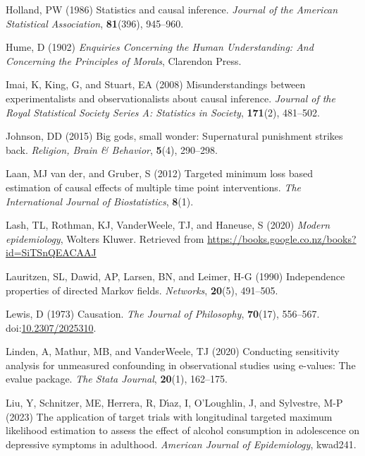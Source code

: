 \documentclass[
  single column]{article}
\newlength{\cslhangindent}
\newenvironment{CSLReferences}[2] %
 {\begin{list}{}{%
  \setlength{\itemindent}{0pt}
  \setlength{\leftmargin}{0pt}
  \setlength{\parsep}{0pt}
  \ifodd #1
   \setlength{\leftmargin}{\cslhangindent}
   \setlength{\itemindent}{-1\cslhangindent}
  \fi
  \setlength{\itemsep}{#2\baselineskip}}}
 {\end{list}}
\begin{document}
\begin{CSLReferences}{1}{0}
Holland, PW (1986) Statistics and causal inference. \emph{Journal of the
American Statistical Association}, \textbf{81}(396), 945--960.

Hume, D (1902) \emph{Enquiries Concerning the Human Understanding: And
Concerning the Principles of Morals}, Clarendon Press.

Imai, K, King, G, and Stuart, EA (2008) Misunderstandings between
experimentalists and observationalists about causal inference.
\emph{Journal of the Royal Statistical Society Series A: Statistics in
Society}, \textbf{171}(2), 481--502.

Johnson, DD (2015) Big gods, small wonder: Supernatural punishment
strikes back. \emph{Religion, Brain \& Behavior}, \textbf{5}(4),
290--298.

Laan, MJ van der, and Gruber, S (2012) Targeted minimum loss based
estimation of causal effects of multiple time point interventions.
\emph{The International Journal of Biostatistics}, \textbf{8}(1).

Lash, TL, Rothman, KJ, VanderWeele, TJ, and Haneuse, S (2020)
\emph{Modern epidemiology}, Wolters Kluwer. Retrieved from
\url{https://books.google.co.nz/books?id=SiTSnQEACAAJ}

Lauritzen, SL, Dawid, AP, Larsen, BN, and Leimer, H-G (1990)
Independence properties of directed {M}arkov fields. \emph{Networks},
\textbf{20}(5), 491--505.

Lewis, D (1973) Causation. \emph{The Journal of Philosophy},
\textbf{70}(17), 556--567.
doi:\href{https://doi.org/10.2307/2025310}{10.2307/2025310}.

Linden, A, Mathur, MB, and VanderWeele, TJ (2020) Conducting sensitivity
analysis for unmeasured confounding in observational studies using
e-values: The evalue package. \emph{The Stata Journal}, \textbf{20}(1),
162--175.

Liu, Y, Schnitzer, ME, Herrera, R, Dı́az, I, O'Loughlin, J, and
Sylvestre, M-P (2023) The application of target trials with longitudinal
targeted maximum likelihood estimation to assess the effect of alcohol
consumption in adolescence on depressive symptoms in adulthood.
\emph{American Journal of Epidemiology}, kwad241.


\end{CSLReferences}
\end{document}
